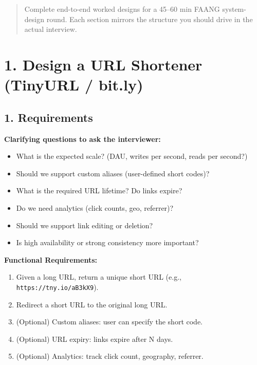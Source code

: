 \documentclass[11pt]{article}
\providecommand{\tightlist}{\setlength{\itemsep}{1pt}\setlength{\parskip}{0pt}}
\begin{document}
\makecoverpage

\thispagestyle{empty}
{\hypersetup{hidelinks}\tableofcontents}
\clearpage

\begin{quote}
Complete end-to-end worked designs for a 45--60 min FAANG system-design round.
Each section mirrors the structure you should drive in the actual interview.
\end{quote}

\section{1. Design a URL Shortener (TinyURL / bit.ly)}\label{1-design-a-url-shortener-tinyurl--bitly}

\subsection{1. Requirements}\label{1-requirements}

\textbf{Clarifying questions to ask the interviewer:}

\begin{itemize}
\tightlist
\item
  What is the expected scale? (DAU, writes per second, reads per second?)
\item
  Should we support custom aliases (user-defined short codes)?
\item
  What is the required URL lifetime? Do links expire?
\item
  Do we need analytics (click counts, geo, referrer)?
\item
  Should we support link editing or deletion?
\item
  Is high availability or strong consistency more important?
\end{itemize}

\textbf{Functional Requirements:}

\begin{enumerate}
\def\labelenumi{\arabic{enumi}.}
\tightlist
\item
  Given a long URL, return a unique short URL (e.g., \texttt{https://tny.io/aB3kX9}).
\item
  Redirect a short URL to the original long URL.
\item
  (Optional) Custom aliases: user can specify the short code.
\item
  (Optional) URL expiry: links expire after N days.
\item
  (Optional) Analytics: track click count, geography, referrer.
\end{enumerate}
\end{document}

